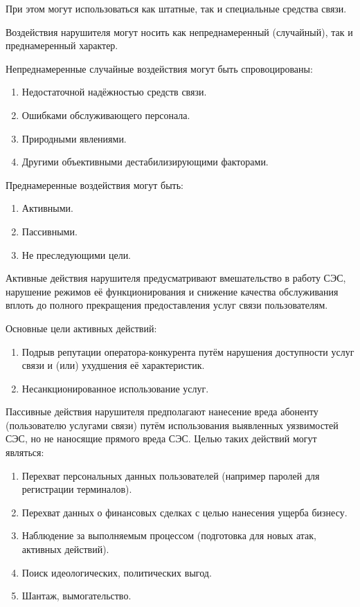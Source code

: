 \documentclass[12pt, russian, oneside, article]{ncc}
\begin{document}
При этом могут использоваться как штатные, так и специальные средства связи.

Воздействия нарушителя могут носить как непреднамеренный (случайный), так и преднамеренный характер.

Непреднамеренные случайные воздействия могут быть спровоцированы:
\begin{enumerate}
\item Недостаточной надёжностью средств связи.
\item Ошибками обслуживающего персонала.
\item Природными явлениями.
\item Другими объективными дестабилизирующими факторами.
\end{enumerate}

Преднамеренные воздействия могут быть:
\begin{enumerate}
\item Активными.
\item Пассивными.
\item Не преследующими цели.
\end{enumerate}

Активные действия нарушителя предусматривают вмешательство в работу СЭС, нарушение режимов её функционирования и снижение качества обслуживания вплоть до полного прекращения предоставления услуг связи пользователям.

Основные цели активных действий:
\begin{enumerate}
\item Подрыв репутации оператора-конкурента путём нарушения доступности услуг связи и (или) ухудшения её характеристик.
\item Несанкционированное использование услуг.
\end{enumerate}

Пассивные действия нарушителя предполагают нанесение вреда абоненту (пользователю услугами связи) путём использования выявленных уязвимостей СЭС, но не наносящие прямого вреда СЭС. Целью таких действий могут являться:
\begin{enumerate}
\item Перехват персональных данных пользователей (например паролей для регистрации терминалов).
\item Перехват данных о финансовых сделках с целью нанесения ущерба бизнесу.
\item Наблюдение за выполняемым процессом (подготовка для новых атак, активных действий).
\item Поиск идеологических, политических выгод.
\item Шантаж, вымогательство.
\end{enumerate}
\end{document}
